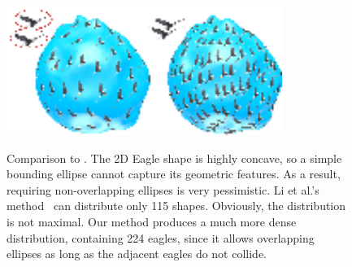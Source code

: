   \begin{figure}[htbp]
  \centering
  \includegraphics[width=0.8\textwidth]{figs/asd/conflict_compare.png}\\
  \caption{Comparison to \cite{li:anisotropic:2010}.
  The 2D Eagle shape is highly concave, so a simple bounding ellipse cannot capture its geometric features.
  As a result, requiring non-overlapping ellipses is very pessimistic.
  Li et al.'s method~\cite{li:anisotropic:2010} can distribute only 115 shapes. Obviously, the distribution is not maximal.
  Our method produces a much more dense distribution, containing 224 eagles,
  since it allows overlapping ellipses as long as the adjacent eagles do not collide.}
  \label{fig:hawk}
  \end{figure}

